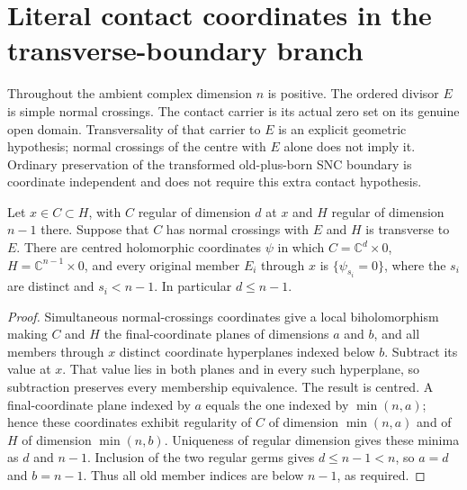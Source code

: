 \section{Literal contact coordinates in the transverse-boundary branch}

Throughout the ambient complex dimension $n$ is positive.  The ordered divisor
$E$ is simple normal crossings.  The contact carrier is its actual zero set on
its genuine open domain.  Transversality of that carrier to $E$ is an explicit
geometric hypothesis; normal crossings of the centre with $E$ alone does not
imply it.  Ordinary preservation of the transformed old-plus-born SNC boundary
is coordinate independent and does not require this extra contact hypothesis.

\begin{lemma}
\label{lem:actual-boundary-contact-centred-coordinates}
\leanok
Let $x\in C\subset H$, with $C$ regular of dimension $d$ at $x$ and $H$ regular
of dimension $n-1$ there.  Suppose that $C$ has normal crossings with $E$ and
$H$ is transverse to $E$.  There are centred holomorphic coordinates $\psi$
in which $C=\mathbb C^d\times0$, $H=\mathbb C^{n-1}\times0$, and every original
member $E_i$ through $x$ is $\{\psi_{s_i}=0\}$, where the $s_i$ are distinct
and $s_i<n-1$.  In particular $d\le n-1$.
\end{lemma}
\begin{proof}
Simultaneous normal-crossings coordinates give a local biholomorphism making
$C$ and $H$ the final-coordinate planes of dimensions $a$ and $b$, and all
members through $x$ distinct coordinate hyperplanes indexed below $b$.
Subtract its value at $x$.  That value lies in both planes and in every such
hyperplane, so subtraction preserves every membership equivalence.  The
result is centred.  A final-coordinate plane indexed by $a$ equals the one
indexed by $\min(n,a)$; hence these coordinates exhibit regularity of $C$ of
dimension $\min(n,a)$ and of $H$ of dimension $\min(n,b)$.  Uniqueness of
regular dimension gives these minima as $d$ and $n-1$.  Inclusion of the two
regular germs gives $d\le n-1<n$, so $a=d$ and $b=n-1$.  Thus all old member
indices are below $n-1$, as required.
\end{proof}

